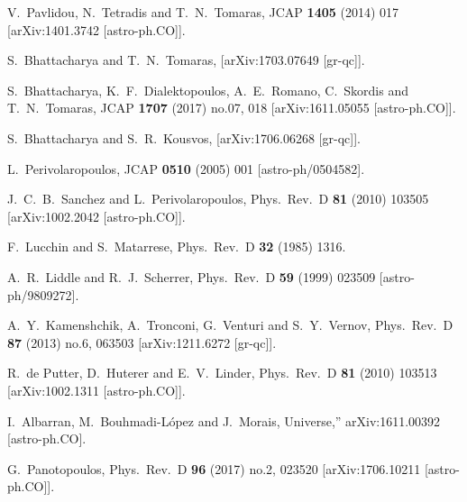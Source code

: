 \begin{thebibliography}{00}
 V.~Pavlidou, N.~Tetradis and T.~N.~Tomaras,
  JCAP {\bf 1405} (2014) 017
[arXiv:1401.3742 [astro-ph.CO]].

 S.~Bhattacharya and T.~N.~Tomaras,
[arXiv:1703.07649 [gr-qc]].

 S.~Bhattacharya, K.~F.~Dialektopoulos, A.~E.~Romano, C.~Skordis and T.~N.~Tomaras,
  JCAP {\bf 1707} (2017) no.07,  018
[arXiv:1611.05055 [astro-ph.CO]].

 S.~Bhattacharya and S.~R.~Kousvos,
[arXiv:1706.06268 [gr-qc]].

 L.~Perivolaropoulos,
  JCAP {\bf 0510} (2005) 001
[astro-ph/0504582].

 J.~C.~B.~Sanchez and L.~Perivolaropoulos,
  Phys.\ Rev.\ D {\bf 81} (2010) 103505
[arXiv:1002.2042 [astro-ph.CO]].
  
  F.~Lucchin and S.~Matarrese,
  Phys.\ Rev.\ D {\bf 32} (1985) 1316. 
  
  A.~R.~Liddle and R.~J.~Scherrer,
  Phys.\ Rev.\ D {\bf 59} (1999) 023509
  [astro-ph/9809272].   
  
 A.~Y.~Kamenshchik, A.~Tronconi, G.~Venturi and S.~Y.~Vernov,
  Phys.\ Rev.\ D {\bf 87} (2013) no.6,  063503
[arXiv:1211.6272 [gr-qc]].

 R.~de Putter, D.~Huterer and E.~V.~Linder,
Phys.\ Rev.\ D {\bf 81} (2010) 103513
[arXiv:1002.1311 [astro-ph.CO]].

 I.~Albarran, M.~Bouhmadi-L{\'o}pez and J.~Morais,
Universe,'' arXiv:1611.00392 [astro-ph.CO].

 G.~Panotopoulos,
  Phys.\ Rev.\ D {\bf 96} (2017) no.2,  023520
[arXiv:1706.10211 [astro-ph.CO]].


\end{thebibliography}
